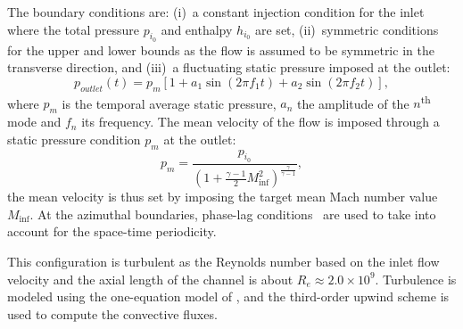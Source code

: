 The boundary conditions are: (i)~a constant injection condition for the inlet
where the total pressure $p_{i_0}$ and enthalpy $h_{i_0}$ are set,
(ii)~symmetric conditions for the upper and lower bounds as the flow
is assumed to be symmetric in the transverse direction, and (iii)~a
fluctuating static pressure imposed at the outlet:
\begin{equation}
  p_{outlet}(t) = p_m \left[1 + a_1 \sin(2 \pi f_1 t) +
    a_2 \sin(2 \pi f_2 t) \right],
  \label{eq:outlet_canal}
\end{equation}
where $p_m$ is the temporal average static pressure, $a_n$ the
amplitude of the $n$\textsuperscript{th} mode and $f_n$ its
frequency.
The mean velocity of the flow is imposed through a
static pressure condition $p_m$ at the outlet:
\begin{equation}
    p_m = \frac{p_{i_0}}{\left(1 + 
    \frac{\gamma - 1}{2} M_{\inf}^2 \right) ^ {\frac{\gamma}{ \gamma - 1}}} ,
\end{equation}
the mean velocity is thus set by imposing the
target mean Mach number value $M_{\inf}$.
At the azimuthal boundaries, phase-lag conditions~\cite{Erdos1977} 
are used to take into account for the space-time periodicity.

This configuration is turbulent as the Reynolds number based on the
inlet flow velocity and the axial length of the channel is about $R_e
\approx 2.0 \times 10^9$.  Turbulence is modeled using the
one-equation model of \citet{Spalart1992}, and the
third-order upwind \citet{Roe1981} scheme is used to compute the
convective fluxes.
